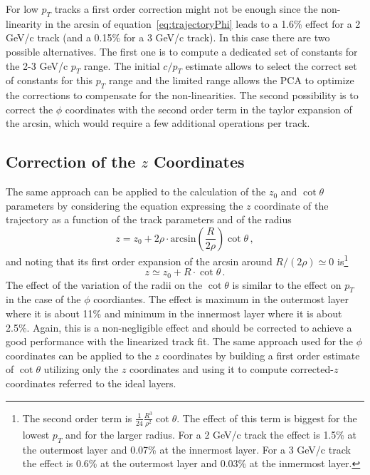 \documentclass[10pt,a4paper]{report}
\begin{document}
For low $p_T$ tracks a first order correction might not be enough since the non-linearity in the arcsin of equation~\ref{eq:trajectoryPhi} leads to a 1.6\% effect for a 2 GeV/c track (and a 0.15\% for a 3 GeV/c track). In this case there are two possible alternatives. The first one is to compute a dedicated set of constants for the 2-3 GeV/c $p_T$ range. The initial $c/p_T$ estimate allows to select the correct set of constants for this $p_T$ range and the limited range allows the PCA to optimize the corrections to compensate for the non-linearities. The second possibility is to correct the $\phi$ coordinates with the second order term in the taylor expansion of the arcsin, which would require a few additional operations per track.

\subsection{Correction of the $z$ Coordinates}

The same approach can be applied to the calculation of the $z_0$ and $\cot\theta$ parameters by considering the equation expressing the $z$ coordinate of the trajectory as a function of the track parameters and of the radius
\begin{equation}
z = z_0 + 2\rho\cdot\mbox{arcsin}\left(\frac{R}{2\rho}\right)\cot\theta\, ,
\end{equation}
and noting that its first order expansion of the arcsin around $R/(2\rho) \simeq 0$ is\footnote{The second order term is $\frac{1}{24}\frac{R^3}{\rho^2}\cot\theta$. The effect of this term is biggest for the lowest $p_T$ and for the larger radius. For a 2 GeV/c track the effect is 1.5\% at the outermost layer and 0.07\% at the innermost layer. For a 3 GeV/c track the effect is 0.6\% at the outermost layer and 0.03\% at the inmermost layer.}
\begin{equation}
z \simeq z_0 + R\cdot\cot\theta\, .
\end{equation}
The effect of the variation of the radii on the $\cot\theta$ is similar to the effect on $p_T$ in the case of the $\phi$ coordiantes. The effect is maximum in the outermost layer where it is about 11\% and minimum in the innermost layer where it is about 2.5\%. Again, this is a non-negligible effect and should be corrected to achieve a good performance with the linearized track fit. The same approach used for the $\phi$ coordinates can be applied to the $z$ coordinates by building a first order estimate of $\cot\theta$ utilizing only the $z$ coordinates and using it to compute corrected-$z$ coordinates referred to the ideal layers.
\end{document}
